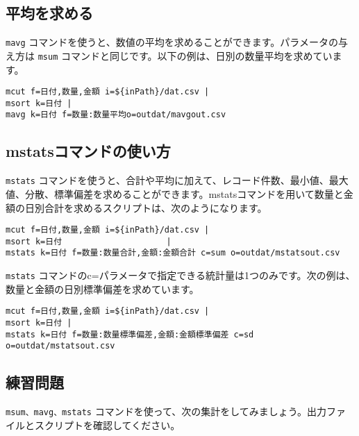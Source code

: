 {\setlength{\parindent}{0cm}

\subsection{平均を求める}

\verb|mavg| コマンドを使うと、数値の平均を求めることができます。パラメータの与え方は \verb|msum| コマンドと同じです。以下の例は、日別の数量平均を求めています。\\

\begin{verbatim}
mcut f=日付,数量,金額 i=${inPath}/dat.csv |
msort k=日付 |
mavg k=日付 f=数量:数量平均o=outdat/mavgout.csv
\end{verbatim}


\subsection{mstatsコマンドの使い方}

\verb|mstats| コマンドを使うと、合計や平均に加えて、レコード件数、最小値、最大値、分散、標準偏差を求めることができます。mstatsコマンドを用いて数量と金額の日別合計を求めるスクリプトは、次のようになります。

\begin{verbatim}
mcut f=日付,数量,金額 i=${inPath}/dat.csv |
msort k=日付                     |
mstats k=日付 f=数量:数量合計,金額:金額合計 c=sum o=outdat/mstatsout.csv
\end{verbatim}

\verb|mstats| コマンドのc=パラメータで指定できる統計量は1つのみです。次の例は、数量と金額の日別標準偏差を求めています。
\begin{verbatim}
mcut f=日付,数量,金額 i=${inPath}/dat.csv |
msort k=日付 |
mstats k=日付 f=数量:数量標準偏差,金額:金額標準偏差 c=sd o=outdat/mstatsout.csv
\end{verbatim}


\subsection{練習問題}

\verb|msum、mavg、mstats| コマンドを使って、次の集計をしてみましょう。出力ファイルとスクリプトを確認してください。

}
